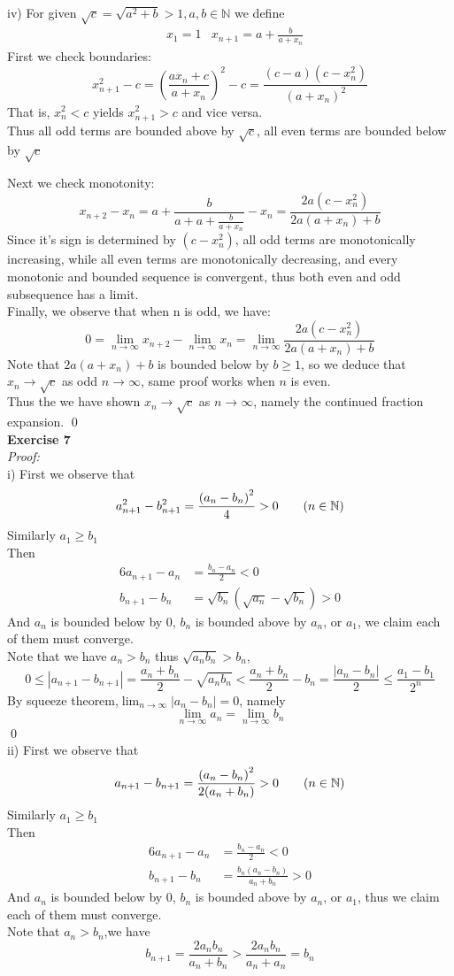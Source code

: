 \documentclass[12pt]{article}
\begin{document}
iv) For given $\sqrt c=\sqrt{a^2+b}>1,a,b\in \mathbb{N}$ we define
\begin{align*}
&x_1=1
&x_{n+1}=a+\frac{b}{a+x_n}
\end{align*}
First we check boundaries:
\[
{x_{n+1}^2-c=
\left(\frac{ax_n+c}{a+x_n}\right)^2-c=
\frac{(c-a)(c-x_n^2)}{(a+x_n)^2}}
\]
That is, $x_n^2<c$ yields $x_{n+1}^2>c$ and vice versa.\\
Thus all odd terms are bounded above by $\sqrt c$,
all even terms are bounded below by $\sqrt c$

Next we check monotonity:
\[
x_{n+2}-x_{n}
=a+\frac{b}{a+a+\frac{b}{a+x_n}}-x_n
=\frac{2a(c-x_n^2)}{2a(a+x_n)+b}
\]
Since it's sign is determined by $(c-x_n^2)$,
all odd terms are monotonically increasing,
while all even terms are monotonically decreasing,
and every monotonic and bounded sequence is convergent,
thus both even and odd subsequence has a limit.\\
Finally, we observe that when n is odd, we have:
\[
0=\lim_{n\to\infty}x_{n+2}-\lim_{n\to\infty}x_n
=\lim_{n\to\infty}\frac{2a(c-x_n^2)}{2a(a+x_n)+b}
\]
Note that $2a(a+x_n)+b$ is bounded below by $b\ge 1$,
so we deduce that $x_n\to\sqrt c$ as odd $n\to\infty$,
same proof works when $n$ is even.\\
Thus the we have shown $x_n\to\sqrt c$ as $n\to\infty$,
namely the continued fraction expansion.
\qed\\


\textbf{Exercise 7}\\
\textit{Proof: }\\
i) First we observe that
\[
a_{n+1}^2-b_{n+1}^2=\frac{{(a_n-b_n)}^2}{4}>0
 \tag{$n\in\mathbb{N}$}
\]
Similarly $a_1\ge b_1$\\
Then
\begin{alignat*}{6}
a_{n+1}-a_n&=\frac{b_n-a_n}{2}<0\\
b_{n+1}-b_n&=\sqrt{b_n}(\sqrt{a_n}-\sqrt{b_n})>0
\end{alignat*}
And $a_n$ is bounded below by 0,
$b_n$ is bounded above by $a_n$,
or $a_1$, we claim each of them must converge.\\
Note that we have $a_n>b_n$ thus $\sqrt{a_nb_n}>b_n$, 
\[
0\leq|a_{n+1}-b_{n+1}|=\frac{a_n+b_n}{2}-\sqrt{a_nb_n}<\frac{a_n+b_n}{2}-b_n=\frac{|a_n-b_n|}{2}\leq\frac{a_1-b_1}{2^n}
\]
By squeeze theorem,$\displaystyle\lim_{n\to\infty}|a_n-b_n|=0$, namely
\[
\lim_{n\to\infty}a_n=\lim_{n\to\infty}b_n
\]
\qed
\\
ii) First we observe that
\[
a_{n+1}-b_{n+1}
=\frac{{(a_n-b_n)}^2}{2(a_n+b_n)}>0 \tag{$n\in\mathbb{N}$}
\]
Similarly $a_1\ge b_1$\\
Then
\begin{alignat*}{6}
a_{n+1}-a_n&=\frac{b_n-a_n}{2}<0\\
b_{n+1}-b_n&=\frac{b_n(a_n-b_n)}{a_n+b_n}>0
\end{alignat*}
And $a_n$ is bounded below by 0,
$b_n$ is bounded above by $a_n$,
or $a_1$, thus we claim each of them must converge.\\
Note that $a_n>b_n$,we have
\[
b_{n+1}=\frac{2a_nb_n}{a_n+b_{n}}>\frac{2a_nb_n}{a_n+a_n}=b_n
\]
\end{document}
